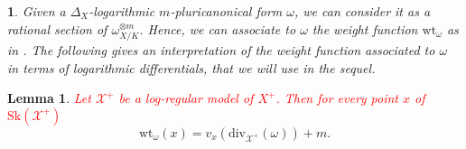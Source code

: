 \documentclass{amsart}%
\numberwithin{equation}{subsection}
\theoremstyle{plain2}
\newtheorem{lemma}[equation]{Lemma}
\theoremstyle{definition2}
\theoremstyle{stepstyle}
\theoremstyle{point}
\theoremstyle{subpoint}
\newtheorem{subpoint}[equation]{}%
\newcommand{\spa}[1]{\begin{subpoint}#1\end{subpoint}}           %
\newcommand{\cX}{\ensuremath{\mathscr{X}}}
\newcommand{\divisor}{\mathrm{div}}
\newcommand{\weight}{\mathrm{wt}}
\newcommand{\Sk}{\mathrm{Sk}}
\begin{document}
\spa{Given a $\Delta_X$-logarithmic $m$-pluricanonical form $\omega$, we can consider it as a rational section of $\omega_{X/K}^{\otimes m}$. Hence, we can associate to $\omega$ the weight function $\weight_{\omega}$ as in \cite{MustataNicaise}. The following gives an interpretation of the weight function associated to $\omega$ in terms of logarithmic differentials, that we will use in the sequel.}
\begin{lemma} \label{lemma log formula for weight function}
\textcolor{red}{Let $\cX^+$ be a log-regular model of $X^+$. Then for every point $x$ of $\Sk(\cX^+)$} $$\weight_{\omega}(x) = v_x(\divisor_{\cX^+}(\omega)) +m.$$
\end{lemma}
\end{document}
